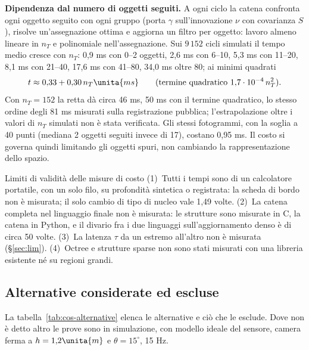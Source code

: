 \textbf{Dipendenza dal numero di oggetti seguiti.} A ogni ciclo la catena confronta ogni oggetto seguito con ogni gruppo (porta $\gamma$ sull'innovazione $\nu$ con covarianza $S$), risolve un'assegnazione ottima \cite{kuhn1955} e aggiorna un filtro per oggetto: lavoro almeno lineare in $n_T$ e polinomiale nell'assegnazione. Sui $9\,152$ cicli simulati il tempo medio cresce con $n_T$: 0,9 ms con 0--2 oggetti, 2,6 ms con 6--10, 5,3 ms con 11--20, 8,1 ms con 21--40, 17,6 ms con 41--80, 34,0 ms oltre 80; ai minimi quadrati
\begin{equation}\label{eq:cos-retta}
t\approx 0{,}33+0{,}30\,n_T\unita{ms}\qquad(\text{termine quadratico } 1{,}7\cdot10^{-4}\,n_T^2).
\end{equation}
Con $n_T=152$ la retta dà circa 46 ms, 50 ms con il termine quadratico, lo stesso ordine degli 81 ms misurati sulla registrazione pubblica; l'estrapolazione oltre i valori di $n_T$ simulati non è stata verificata. Gli stessi fotogrammi, con la soglia a 40 punti (mediana 2 oggetti seguiti invece di 17), costano 0,95 ms. Il costo si governa quindi limitando gli oggetti spuri, non cambiando la rappresentazione dello spazio. 

\begin{riquadro}{Limiti di validità delle misure di costo}
(1)~Tutti i tempi sono di un calcolatore portatile, con un solo filo, su profondità sintetica o registrata: la scheda di bordo non è misurata; il solo cambio di tipo di nucleo vale 1,49 volte. (2)~La catena completa nel linguaggio finale non è misurata: le strutture sono misurate in C, la catena in Python, e il divario fra i due linguaggi sull'aggiornamento denso è di circa 50 volte. (3)~La latenza $\tau$ da un estremo all'altro non è misurata (\S\ref{sec:lim}). (4)~Octree e strutture sparse non sono stati misurati con una libreria esistente né su regioni grandi. 
\end{riquadro}

\subsection{Alternative considerate ed escluse}\label{sec:cos-alternative}

La tabella~\ref{tab:cos-alternative} elenca le alternative e ciò che le esclude. Dove non è detto altro le prove sono in simulazione, con modello ideale del sensore, camera ferma a $h=1{,}2\unita{m}$ e $\theta=15^\circ$, 15 Hz.


